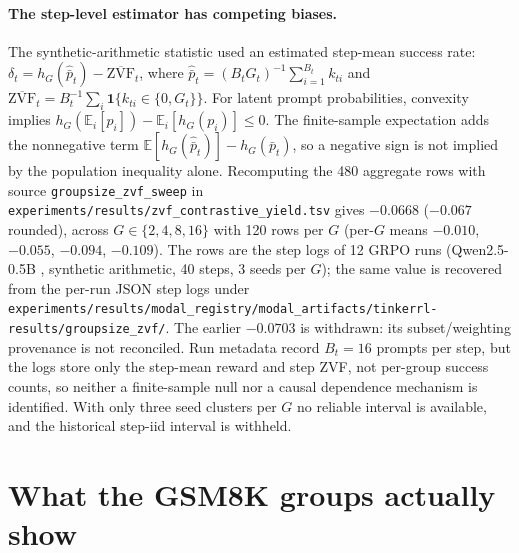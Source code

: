 \documentclass[11pt]{article}
\begin{document}
\paragraph{The step-level estimator has competing biases.}
The synthetic-arithmetic statistic used an estimated step-mean success rate:
$\delta_t=h_G(\hat{\bar p}_t)-\overline{\mathrm{ZVF}}_t$, where
$\hat{\bar p}_t=(B_tG_t)^{-1}\sum_{i=1}^{B_t}k_{ti}$ and
$\overline{\mathrm{ZVF}}_t=B_t^{-1}\sum_i\mathbf1\{k_{ti}\in\{0,G_t\}\}$.
For latent prompt probabilities, convexity implies
$h_G(\mathbb E_i[p_i])-\mathbb E_i[h_G(p_i)]\le0$.
The finite-sample expectation adds the nonnegative term
$\mathbb E[h_G(\hat{\bar p}_t)]-h_G(\bar p_t)$, so a negative sign is not
implied by the population inequality alone. Recomputing the 480 aggregate rows
with source \texttt{groupsize\_zvf\_sweep} in
\nolinkurl{experiments/results/zvf_contrastive_yield.tsv} gives $-0.0668$
($-0.067$ rounded), across $G\in\{2,4,8,16\}$ with 120 rows per $G$
(per-$G$ means $-0.010$, $-0.055$, $-0.094$, $-0.109$). The rows are the step
logs of 12 GRPO runs (Qwen2.5-0.5B \citep{qwen2024qwen25}, synthetic arithmetic,
40 steps, 3 seeds per $G$); the same value is recovered from the per-run
JSON step logs under
\nolinkurl{experiments/results/modal_registry/modal_artifacts/tinkerrl-results/groupsize_zvf/}.
The earlier $-0.0703$ is withdrawn: its subset/weighting provenance
is not reconciled. Run metadata record $B_t=16$ prompts per step, but the logs
store only the step-mean reward and step ZVF, not per-group success counts, so
neither a finite-sample null nor a causal dependence mechanism is identified.
With only three seed clusters per $G$ no reliable interval is available, and the
historical step-iid interval is withheld.

\section{What the GSM8K groups actually show}
\label{sec:gsm8k}
\end{document}
